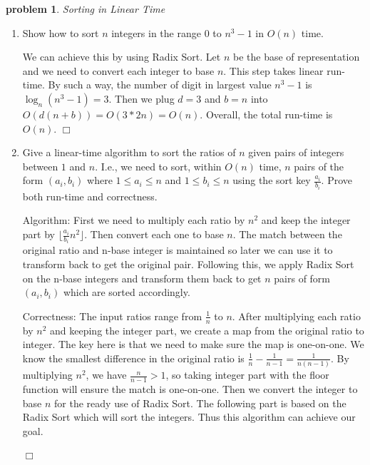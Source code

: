 \documentclass[10pt]{article}
\newenvironment{proof}{\par\noindent{\it Proof.}\hspace*{1em}}{$\Box$\bigskip}
\newtheorem{problem}{\sc\color{cit}problem}
\begin{document}
\vspace*{.25in} %
\begin{problem} Sorting in Linear Time \end{problem}
\begin{enumerate}
    \item Show how to sort $n$ integers in the range $0$ to $n^3 - 1$ in $O(n)$ time.
    \begin{proof}
    We can achieve this by using Radix Sort. Let $n$ be the base of representation and we need to convert each integer to base $n$. This step takes linear run-time. By such a way, the number of digit in largest value $n^3-1$ is $\log_n (n^3-1)=3$. Then we plug $d=3$ and $b=n$ into $O(d(n+b))=O(3*2n)=O(n)$. Overall, the total run-time is $O(n)$.
    \end{proof}
    \item Give a linear-time algorithm to sort the ratios of $n$ given pairs of integers between $1$ and $n$. I.e., we need to sort, within $O(n)$ time, $n$ pairs of the form $(a_i,b_i)$ where $1 \leq  a_i \leq n$ and $1 \leq b_i \leq n$ using the sort key $\frac{a_i}{b_i}$. Prove both run-time and correctness.
    \begin{proof}
    Algorithm: First we need to multiply each ratio by $n^2$ and keep the integer part by $\lfloor \frac{a_i}{b_i}n^2\rfloor$. Then convert each one to base $n$. The match between the original ratio and n-base integer is maintained so later we can use it to transform back to get the original pair. Following this, we apply Radix Sort on the n-base integers and transform them back to get $n$ pairs of form $(a_i, b_i)$ which are sorted accordingly. 
    
    Correctness: The input ratios range from $\frac{1}{n}$ to $n$. After multiplying each ratio by $n^2$ and keeping the integer part, we create a map from the original ratio to integer. The key here is that we need to make sure the map is one-on-one. We know the smallest difference in the original ratio is $\frac{1}{n}-\frac{1}{n-1}=\frac{1}{n(n-1)}$. By multiplying $n^2$, we have $\frac{n}{n-1}>1$, so taking integer part with the floor function will ensure the match is one-on-one. Then we convert the integer to base $n$ for the ready use of Radix Sort. The following part is based on the Radix Sort which will sort the integers. Thus this algorithm can achieve our goal. 
    

\end{proof}
\end{enumerate}
\end{document}
